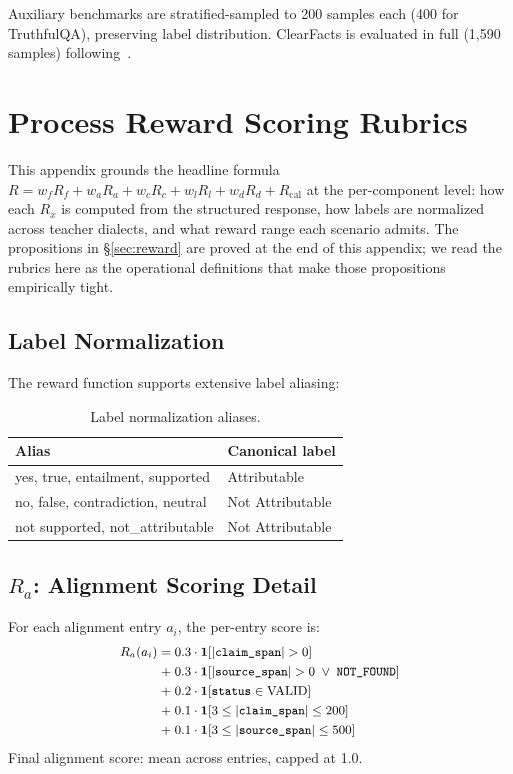 \documentclass{article}
\begin{document}
Auxiliary benchmarks are stratified-sampled to 200 samples each (400 for TruthfulQA), preserving label distribution.
ClearFacts is evaluated in full (1,590 samples) following~\citet{seo2025vtv}.


\section{Process Reward Scoring Rubrics}
\label{app:reward}

This appendix grounds the headline formula $R = w_f R_f + w_a R_a + w_c R_c + w_l R_l + w_d R_d + R_{\text{cal}}$ at the per-component level: how each $R_x$ is computed from the structured response, how labels are normalized across teacher dialects, and what reward range each scenario admits.
The propositions in \S\ref{sec:reward} are proved at the end of this appendix; we read the rubrics here as the operational definitions that make those propositions empirically tight.

\subsection{Label Normalization}

The reward function supports extensive label aliasing:

\begin{table}[h]
\centering
\small
\caption{Label normalization aliases.}
\label{tab:aliases}
\begin{tabular}{ll}
\toprule
\textbf{Alias} & \textbf{Canonical label} \\
\midrule
yes, true, entailment, supported & Attributable \\
no, false, contradiction, neutral & Not Attributable \\
not supported, not\_attributable & Not Attributable \\
\bottomrule
\end{tabular}
\end{table}

\subsection{$R_a$: Alignment Scoring Detail}

For each alignment entry $a_i$, the per-entry score is:
\begin{equation}
\small
\begin{aligned}
R_a(a_i) = & \; 0.3 \cdot \mathbf{1}[|\texttt{claim\_span}| > 0] \\
          + & \; 0.3 \cdot \mathbf{1}[|\texttt{source\_span}| > 0 \;\lor\; \texttt{NOT\_FOUND}] \\
          + & \; 0.2 \cdot \mathbf{1}[\texttt{status} \in \text{VALID}] \\
          + & \; 0.1 \cdot \mathbf{1}[3 \leq |\texttt{claim\_span}| \leq 200] \\
          + & \; 0.1 \cdot \mathbf{1}[3 \leq |\texttt{source\_span}| \leq 500]
\end{aligned}
\end{equation}
Final alignment score: mean across entries, capped at 1.0.
\end{document}

